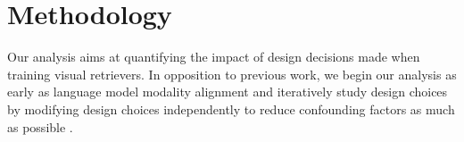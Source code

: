 



\section{Methodology}\label{sec:methodology}



Our analysis aims at quantifying the impact of design decisions made when training visual retrievers. In opposition to previous work, we begin our analysis as early as language model modality alignment and iteratively study design choices by modifying design choices independently to reduce confounding factors as much as possible .


